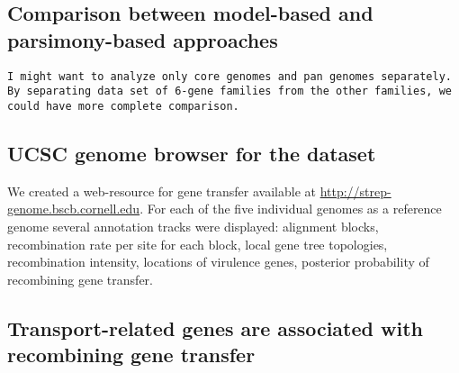 \documentclass[english]{article}
\begin{document}
\subsection{Comparison between model-based and parsimony-based approaches}
\texttt{I might want to analyze only core genomes and pan genomes
separately. By separating data set of 6-gene families from the other families,
we could have more complete comparison.}

\subsection{UCSC genome browser for the dataset}
We created a web-resource for gene transfer available at
\url{http://strep-genome.bscb.cornell.edu}.  For each of the five individual
genomes as a reference genome several annotation tracks were displayed:
alignment blocks, recombination rate per site for each block, local gene tree
topologies, recombination
intensity, locations of virulence genes, posterior probability of recombining
gene transfer.  

\subsection{Transport-related genes are associated with recombining gene transfer}
\end{document}

